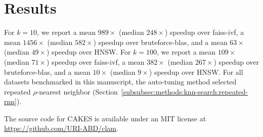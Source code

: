 \section{Results}
\label{sec:results}

For $k= 10$, we report a mean $989\times$ (median $248\times$) speedup over faiss-ivf, a mean $1456\times$ (median $582\times$) speedup over bruteforce-blas, 
and a mean $63\times$ (median $49\times$) speedup over HNSW. For $k=100$, we report a mean $109\times$ (median $71\times$) speedup over faiss-ivf, a mean $382\times$ (median $267\times$) speedup over bruteforce-blas, and a mean $10\times$ (median $9\times$) speedup over HNSW.
For all datasets benchmarked in this manuscript, the auto-tuning method selected repeated $\rho$-nearest neighbor (Section~\ref{subsubsec:methods:knn-search:repeated-rnn}).

The source code for CAKES is available under an MIT
license at \url{https://github.com/URI-ABD/clam}.

